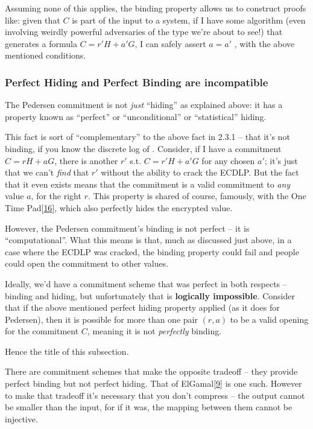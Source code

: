 \documentclass[10pt,a4paper]{article}
\begin{document}
Assuming none of this applies, the binding property allows us to
construct proofs like: given that $C$ is part of the input to a system, if I
have some algorithm (even involving weirdly powerful adversaries of the
type we're about to see!) that generates a formula $C=r'H + a'G$, I can safely assert $a=a'$
, with the above mentioned conditions.

\hypertarget{perfect-hiding-and-perfect-binding-are-incompatible}{%
\subsubsection[Perfect Hiding and Perfect Binding are
incompatible]{\texorpdfstring{\protect\hypertarget{anchor-18}{}{}Perfect
Hiding and Perfect Binding are
incompatible}{Perfect Hiding and Perfect Binding are incompatible}}\label{perfect-hiding-and-perfect-binding-are-incompatible}}

The Pedersen commitment is not \emph{just} ``hiding'' as explained
above: it has a property known as ``perfect'' or ``unconditional'' or
``statistical'' hiding.

This fact is sort of ``complementary'' to the above fact in 2.3.1 --
that it's not binding, if you know the discrete log of . Consider, if I
have a commitment $C=rH+aG$, there is another $r'$ s.t. $C=r'H + a'G$ for any chosen $a'$; it's just that we can't
\emph{find} that $r'$ without the ability to crack the ECDLP. But the fact
that it even exists means that the commitment is a valid commitment to
\emph{any} value $a$, for the right $r$. This property is shared of course,
famously, with the One Time Pad{[}\protect\hyperlink{anchor-19}{16}{]},
which also perfectly hides the encrypted value.

However, the Pedersen commitment's binding is not perfect -- it is
``computational''. What this means is that, much as discussed just
above, in a case where the ECDLP was cracked, the binding property could
fail and people could open the commitment to other values.

Ideally, we'd have a commitment scheme that was perfect in both respects
-- binding and hiding, but unfortunately that is \textbf{logically
impossible}. Consider that if the above mentioned perfect hiding
property applied (as it does for Pedersen), then it is possible for more
than one pair $(r, a)$ to be a valid opening for the commitment $C$, meaning it is
not \emph{perfectly} binding.

Hence the title of this subsection.

There are commitment schemes that make the opposite tradeoff -- they
provide perfect binding but not perfect hiding. That of
ElGamal{[}\protect\hyperlink{anchor-20}{9}{]} is one such. However to
make that tradeoff it's necessary that you don't compress -- the output
cannot be smaller than the input, for if it was, the mapping between
them cannot be injective.
\end{document}
